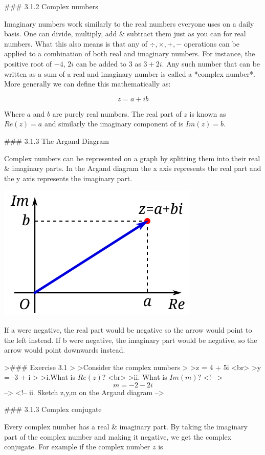 \documentclass{book}
\begin{document}
### 3.1.2 Complex numbers 

Imaginary numbers work similarly to the real numbers everyone uses on a  daily basis. One can divide, multiply, add & subtract them just as you can for real numbers. What this also means is that any of $ \div ,\times, +, - $ operations can be applied to a combination of both real and imaginary numbers. For instance, the positive root of $-4$, $2i$ can be added to $3$ as $3 + 2i $. Any such number that can be written as a sum of a real and imaginary number is called a *complex number*. More generally we can define this mathematically as:

$$ z = a + ib $$

Where $a$ and $b$ are purely real numbers. The real part of $z$ is known as $ Re(z) = a$ and similarly the imaginary component of is $ Im(z) = b$. 

### 3.1.3 The Argand Diagram

Complex numbers can be represented on a graph by splitting them into their real & imaginary parts. In the Argand diagram the x axis represents the real part and the y axis represents the imaginary part. 

\includegraphics{images/A_plus_bi.svg}

If a were negative, the real part would be negative so the arrow would point to the left instead. If b were negative, the imaginary part would be negative, so the arrow would point downwards instead. 


>### Exercise 3.1
>
>Consider the complex numbers 
>
>z = 4 + 5i <br>
>y = -3 + i 
>
>i.What is $Re(z)$? <br>
>ii. What is $Im(m)$? 
<!-- >$$m = -2 - 2i $$ -->
<!-- ii. Sketch z,y,m on the Argand diagram -->


### 3.1.3 Complex conjugate

Every complex number has a real & imaginary part. By taking the imaginary part of the complex number and making it negative, we get the complex conjugate. For example if the complex number $z$ is 
\end{document}
